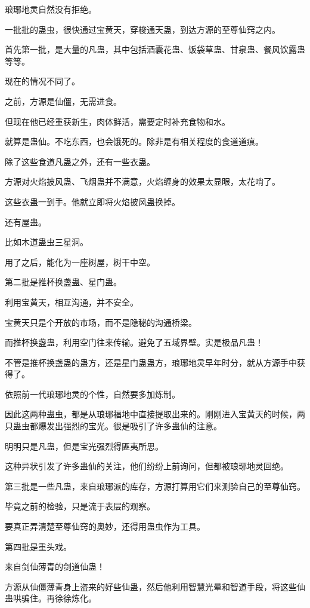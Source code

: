 \begin{this_body}
琅琊地灵自然没有拒绝。

一批批的蛊虫，很快通过宝黄天，穿梭通天蛊，到达方源的至尊仙窍之内。

首先第一批，是大量的凡蛊，其中包括酒囊花蛊、饭袋草蛊、甘泉蛊、餐风饮露蛊等等。

现在的情况不同了。

之前，方源是仙僵，无需进食。

但现在他已经重获新生，肉体鲜活，需要定时补充食物和水。

就算是蛊仙。不吃东西，也会饿死的。除非是有相关程度的食道道痕。

除了这些食道凡蛊之外，还有一些衣蛊。

方源对火焰披风蛊、飞烟蛊并不满意，火焰缠身的效果太显眼，太花哨了。

这些衣蛊一到手。他就立即将火焰披风蛊换掉。

还有屋蛊。

比如木道蛊虫三星洞。

用了之后，能化为一座树屋，树干中空。

第二批是推杯换盏蛊、星门蛊。

利用宝黄天，相互沟通，并不安全。

宝黄天只是个开放的市场，而不是隐秘的沟通桥梁。

而推杯换盏蛊，利用空门往来传输。避免了五域界壁。实是极品凡蛊！

不管是推杯换盏蛊的蛊方，还是星门蛊蛊方，琅琊地灵早年时分，就从方源手中获得了。

依照前一代琅琊地灵的个性，自然要多加炼制。

因此这两种蛊虫，都是从琅琊福地中直接提取出来的。刚刚进入宝黄天的时候，两只蛊虫都爆发出强烈的宝光。很是吸引了许多蛊仙的注意。

明明只是凡蛊，但是宝光强烈得匪夷所思。

这种异状引发了许多蛊仙的关注，他们纷纷上前询问，但都被琅琊地灵回绝。

第三批是一些凡蛊，来自琅琊派的库存，方源打算用它们来测验自己的至尊仙窍。

毕竟之前的检验，只是流于表层的观察。

要真正弄清楚至尊仙窍的奥妙，还得用蛊虫作为工具。

第四批是重头戏。

来自剑仙薄青的剑道仙蛊！

方源从仙僵薄青身上盗来的好些仙蛊，然后他利用智慧光晕和智道手段，将这些仙蛊哄骗住。再徐徐炼化。


\end{this_body}
